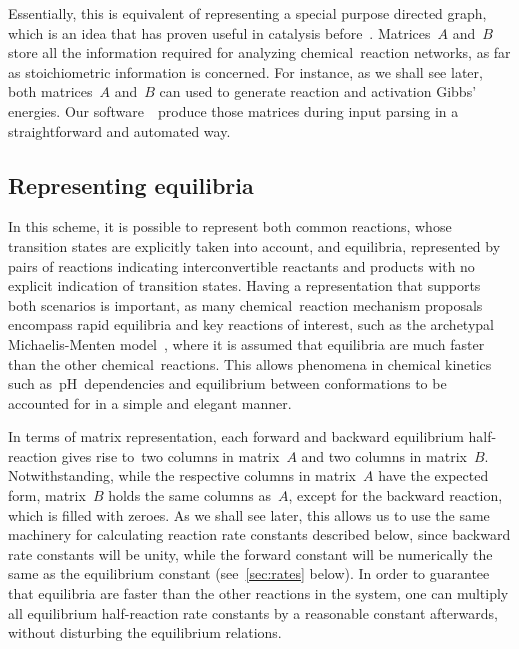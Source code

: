 Essentially,
this is equivalent of representing a special purpose directed graph,
which is an idea that has proven useful in catalysis before~\cite{Kozuch_2006,Kozuch_2015,Solel_2019}.
Matrices~$A$ and~$B$ store all the information required
for analyzing chemical~reaction networks,
as far as stoichiometric information is concerned.
For instance,
as we shall see later,
both matrices~$A$ and~$B$ can used to generate reaction and activation Gibbs' energies.
Our software~\overreact{}~produce those matrices during input parsing in a straightforward and automated way.

\subsection{Representing equilibria}%
\label{sec:kin-repr-equi}

In this scheme,
it is possible to represent both common reactions,
whose transition states are explicitly taken into account,
and equilibria,
represented by pairs of reactions indicating interconvertible reactants and products with no explicit indication of transition states.
Having a representation that supports both scenarios is important,
as many chemical~reaction mechanism proposals encompass rapid equilibria and key reactions of interest,
such as the archetypal Michaelis-Menten model~\cite{Michaelis_1913,Johnson_2011,Srinivasan_2020,Srinivasan_2021},
where it is assumed that equilibria are much faster than the other chemical~reactions.
This allows phenomena in chemical kinetics such as~pH~dependencies and equilibrium between conformations to be accounted for in a simple and elegant manner.

In terms of matrix representation,
each forward and backward equilibrium half-reaction gives rise to~two columns in matrix~$A$ and two columns in matrix~$B$.
Notwithstanding,
while the respective columns in matrix~$A$ have the expected form,
matrix~$B$ holds the same columns as~$A$,
except for the backward reaction,
which is filled with zeroes.
As we shall see later,
this allows us to use the same machinery for calculating reaction rate constants described below,
since backward rate constants will be unity,
while the forward constant will be numerically the same as the equilibrium constant (see~\cref{sec:rates} below).
In order to guarantee that equilibria are faster than the other reactions in the system,
one can multiply all equilibrium half-reaction rate constants by a reasonable constant afterwards,
without disturbing the equilibrium relations.

